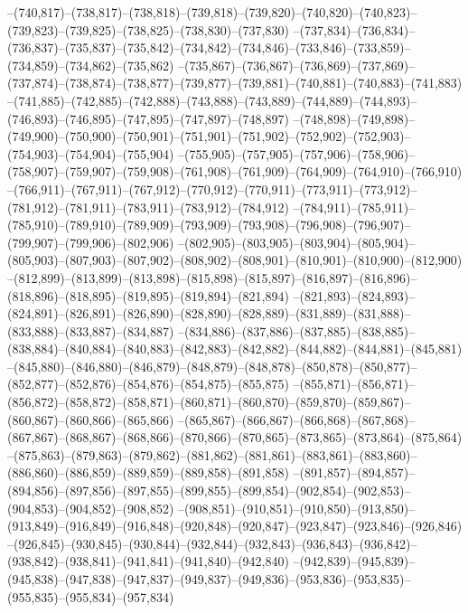 --(740,817)--(738,817)--(738,818)--(739,818)--(739,820)--(740,820)--(740,823)--(739,823)--(739,825)--(738,825)--(738,830)--(737,830)
--(737,834)--(736,834)--(736,837)--(735,837)--(735,842)--(734,842)--(734,846)--(733,846)--(733,859)--(734,859)--(734,862)--(735,862)
--(735,867)--(736,867)--(736,869)--(737,869)--(737,874)--(738,874)--(738,877)--(739,877)--(739,881)--(740,881)--(740,883)--(741,883)
--(741,885)--(742,885)--(742,888)--(743,888)--(743,889)--(744,889)--(744,893)--(746,893)--(746,895)--(747,895)--(747,897)--(748,897)
--(748,898)--(749,898)--(749,900)--(750,900)--(750,901)--(751,901)--(751,902)--(752,902)--(752,903)--(754,903)--(754,904)--(755,904)
--(755,905)--(757,905)--(757,906)--(758,906)--(758,907)--(759,907)--(759,908)--(761,908)--(761,909)--(764,909)--(764,910)--(766,910)
--(766,911)--(767,911)--(767,912)--(770,912)--(770,911)--(773,911)--(773,912)--(781,912)--(781,911)--(783,911)--(783,912)--(784,912)
--(784,911)--(785,911)--(785,910)--(789,910)--(789,909)--(793,909)--(793,908)--(796,908)--(796,907)--(799,907)--(799,906)--(802,906)
--(802,905)--(803,905)--(803,904)--(805,904)--(805,903)--(807,903)--(807,902)--(808,902)--(808,901)--(810,901)--(810,900)--(812,900)
--(812,899)--(813,899)--(813,898)--(815,898)--(815,897)--(816,897)--(816,896)--(818,896)--(818,895)--(819,895)--(819,894)--(821,894)
--(821,893)--(824,893)--(824,891)--(826,891)--(826,890)--(828,890)--(828,889)--(831,889)--(831,888)--(833,888)--(833,887)--(834,887)
--(834,886)--(837,886)--(837,885)--(838,885)--(838,884)--(840,884)--(840,883)--(842,883)--(842,882)--(844,882)--(844,881)--(845,881)
--(845,880)--(846,880)--(846,879)--(848,879)--(848,878)--(850,878)--(850,877)--(852,877)--(852,876)--(854,876)--(854,875)--(855,875)
--(855,871)--(856,871)--(856,872)--(858,872)--(858,871)--(860,871)--(860,870)--(859,870)--(859,867)--(860,867)--(860,866)--(865,866)
--(865,867)--(866,867)--(866,868)--(867,868)--(867,867)--(868,867)--(868,866)--(870,866)--(870,865)--(873,865)--(873,864)--(875,864)
--(875,863)--(879,863)--(879,862)--(881,862)--(881,861)--(883,861)--(883,860)--(886,860)--(886,859)--(889,859)--(889,858)--(891,858)
--(891,857)--(894,857)--(894,856)--(897,856)--(897,855)--(899,855)--(899,854)--(902,854)--(902,853)--(904,853)--(904,852)--(908,852)
--(908,851)--(910,851)--(910,850)--(913,850)--(913,849)--(916,849)--(916,848)--(920,848)--(920,847)--(923,847)--(923,846)--(926,846)
--(926,845)--(930,845)--(930,844)--(932,844)--(932,843)--(936,843)--(936,842)--(938,842)--(938,841)--(941,841)--(941,840)--(942,840)
--(942,839)--(945,839)--(945,838)--(947,838)--(947,837)--(949,837)--(949,836)--(953,836)--(953,835)--(955,835)--(955,834)--(957,834)
